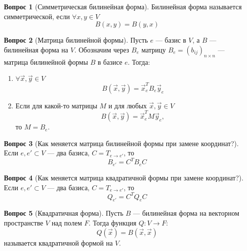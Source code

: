 \documentclass[a4paper,11pt]{article}
\theoremstyle{remark}
\theoremstyle{definition}
\newtheorem{question}{Вопрос}
\begin{document}
\begin{question}[Симметрическая билинейная форма]
Билинейная форма называется симметрической, если \(\forall x,y \in V\)
\begin{equation*}
	B(x, y) = B(y, x)
\end{equation*}
\end{question}


\begin{question}[Матрица билинейной формы]
Пусть \(e\) --- базис в \(V\), а \(B\) --- билинейная форма на \(V\). Обозначим через \(B_e\) матрицу \(B_e = (b_{ij})_{n \times n}\) --- матрица билинейной формы \(B\) в базисе \(e\). Тогда:
\begin{enumerate}
	\item \(\forall \vec{x}, \vec{y} \in V\)
	\begin{equation*}
		B(\vec{x}, \vec{y}) = \vec{x}_e^T B_e \vec{y}_e
	\end{equation*}
	\item Если для какой-то матрицы \(M\) и для любых \(\vec{x}, \vec{y} \in V\) 
	\begin{equation*}
		B(\vec{x}, \vec{y}) = \vec{x}_e^T M \vec{y}_e,
	\end{equation*}
	то \(M = B_e\).
\end{enumerate}
\end{question}


\begin{question}[Как меняется матрица билинейной формы при замене координат?]
Если \(e, e' \subset V\) --- два базиса, \(C = T_{e \rightarrow e'}\), то 
\begin{equation*}
	B_{e'} = C^T B_e C
\end{equation*}
\end{question}


\begin{question}[Как меняется матрица квадратичной формы при замене координат?]
Если \(e, e' \subset V\) --- два базиса, \(C = T_{e \rightarrow e'}\), то 
\begin{equation*}
	Q_{e'} = C^T Q_e C
\end{equation*}
\end{question}


\begin{question}[Квадратичная форма]
Пусть \(B\) --- билинейная форма на векторном пространстве \(V\) над полем \(F\). Тогда функция \(Q: V \rightarrow F\):
\begin{equation*}
	Q(\vec{x}) = B(\vec{x}, \vec{x})
\end{equation*}
называется квадратичной формой на \(V\).
\end{question}
\end{document}
